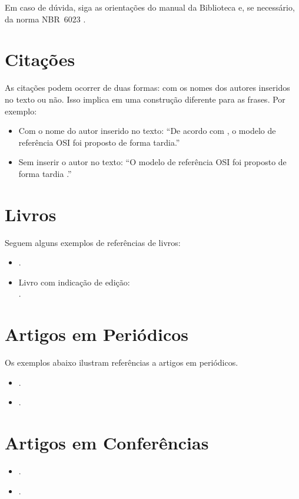 \documentclass[twoside,english,brazilian]{UNISINOSmonografia}
\begin{document}
Em caso de dúvida, siga as orientações do manual da Biblioteca \cite{Biblioteca11} e, se necessário, da norma NBR~6023 \cite{NBR6023:2002}.

\section{Citações}
As citações podem ocorrer de duas formas: com os nomes dos autores inseridos no texto ou não.  Isso implica em uma construção diferente para as frases.  Por exemplo:
\begin{itemize}
	\item Com o nome do autor inserido no texto: ``De acordo com , o modelo de referência OSI foi proposto de forma tardia.''
	\item Sem inserir o autor no texto: ``O modelo de referência OSI foi proposto de forma tardia \cite{Tanenbaum03}.''
\end{itemize}

\section{Livros}
Seguem alguns exemplos de referências de livros:
\begin{itemize}
	\item {}.
	\item Livro com indicação de edição:\\
	.
\end{itemize}

\section{Artigos em Periódicos}
Os exemplos abaixo ilustram referências a artigos em periódicos.
\begin{itemize}
	\item {}.
	\item {}.
\end{itemize}

\section{Artigos em Conferências}
\begin{itemize}
	\item {}.
	\item {}.
\end{itemize}
\end{document}
